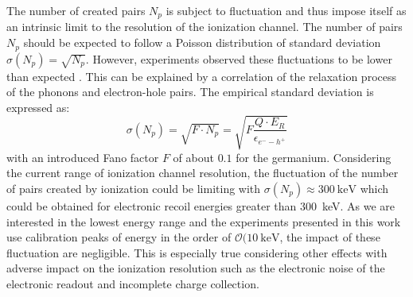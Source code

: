 The number of created pairs $N_p$ is subject to fluctuation and thus impose itself as an intrinsic limit to the resolution of the ionization channel. The number of pairs $N_p$ should be expected to follow a Poisson distribution of standard deviation $\sigma(N_p) = \sqrt{N_p}$. However, experiments observed these fluctuations to be lower than expected . This can be explained by a correlation of the relaxation process of the phonons and electron-hole pairs. The empirical standard deviation is expressed as:
\begin{equation}
\sigma(N_p)
=
\sqrt{F \cdot N_p}
=
\sqrt{F \frac{Q \cdot E_R}{\epsilon_{e^--h^+}}}
\end{equation}
with an introduced Fano factor $F$ of about $0.1$ for the germanium. Considering the current range of ionization channel resolution, the fluctuation of the number of pairs created by ionization could be limiting with $\sigma(N_p) \approx \SI{300}{\kilo\eV}$ which could be obtained for electronic recoil energies greater than \SI{300}{\kilo\eV}. As we are interested in the lowest energy range and the experiments presented in this work use calibration peaks of energy in the order of $\mathcal{O}(\SI{10}{\kilo\eV}$, the impact of these fluctuation are negligible. This is especially true considering other effects with adverse impact on the ionization resolution such as the electronic noise of the electronic readout and incomplete charge collection.

